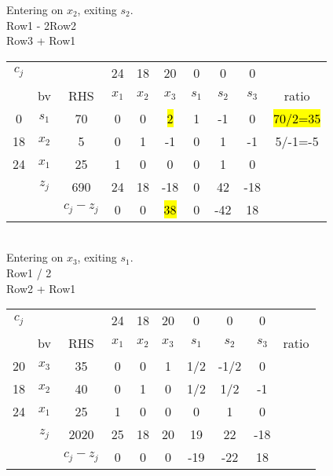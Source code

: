 \documentclass[answers]{exam}
\begin{document}
\noindent
Entering on $x_2$, exiting $s_2$. \\
Row1 - 2Row2 \\
Row3 + Row1 \\

\begin{tabular}{cccccccccc}
	$c_j$                   &                            &                                & 24    & 18    & 20    & 0     & 0     & 0     &       \\
	\multicolumn{1}{c|}{}   & \multicolumn{1}{c|}{bv}    & \multicolumn{1}{c|}{RHS}       & $x_1$ & $x_2$ & $x_3$ & $s_1$ & $s_2$ & $s_3$ & ratio \\ \cline{1-9}
	\multicolumn{1}{c|}{0}  & \multicolumn{1}{c|}{$s_1$} & \multicolumn{1}{c|}{70}        & 0     & 0     & \hl{2}     & 1     & -1    & 0     &  \hl{70/2=35}     \\
	\multicolumn{1}{c|}{18} & \multicolumn{1}{c|}{$x_2$} & \multicolumn{1}{c|}{5}         & 0     & 1     & -1    & 0     & 1     & -1    & 5/-1=-5 \\
	\multicolumn{1}{c|}{24} & \multicolumn{1}{c|}{$x_1$} & \multicolumn{1}{c|}{25}        & 1     & 0     & 0     & 0     & 1     & 0     &       \\ \cline{1-9}
	& \multicolumn{1}{c|}{$z_j$} & \multicolumn{1}{c|}{690}        & 24    & 18    & -18   & 0     & 42    & -18   &       \\ \cline{3-9}
	&                            & \multicolumn{1}{c|}{$c_j-z_j$} & 0     & 0     & \hl{38}    & 0     & -42   & 18    &      
\end{tabular} \\

\noindent
Entering on $x_3$, exiting $s_1$. \\
Row1 / 2 \\
Row2 + Row1

\begin{tabular}{cccccccccc}
	$c_j$                   &                            &                                & 24    & 18    & 20    & 0     & 0     & 0     &       \\
	\multicolumn{1}{c|}{}   & \multicolumn{1}{c|}{bv}    & \multicolumn{1}{c|}{RHS}       & $x_1$ & $x_2$ & $x_3$ & $s_1$ & $s_2$ & $s_3$ & ratio \\ \cline{1-9}
	\multicolumn{1}{c|}{20} & \multicolumn{1}{c|}{$x_3$} & \multicolumn{1}{c|}{35}        & 0     & 0     & 1     & 1/2   & -1/2  & 0     &       \\
	\multicolumn{1}{c|}{18} & \multicolumn{1}{c|}{$x_2$} & \multicolumn{1}{c|}{40}        & 0     & 1     & 0     & 1/2   & 1/2   & -1    &       \\
	\multicolumn{1}{c|}{24} & \multicolumn{1}{c|}{$x_1$} & \multicolumn{1}{c|}{25}        & 1     & 0     & 0     & 0     & 1     & 0     &       \\ \cline{1-9}
	& \multicolumn{1}{c|}{$z_j$} & \multicolumn{1}{c|}{2020}      & 25    & 18    & 20    & 19    & 22    & -18   &       \\ \cline{3-9}
	&                            & \multicolumn{1}{c|}{$c_j-z_j$} & 0     & 0     & 0     & -19   & -22   & 18    &      
\end{tabular} \\
\end{document}
